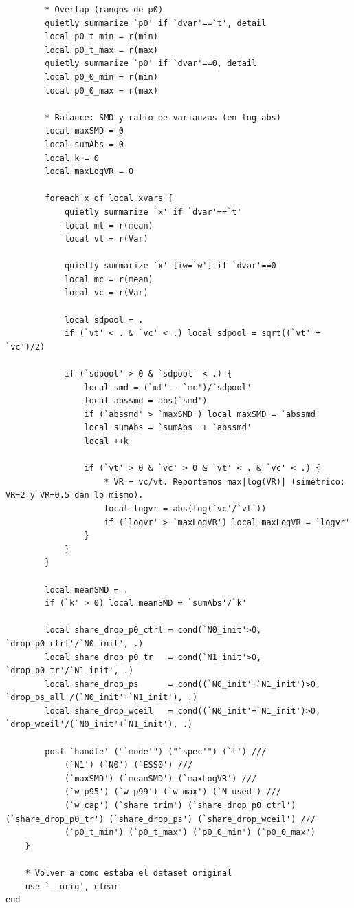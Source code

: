 \documentclass[12pt]{article}
\begin{document}
\begin{lstlisting}
        * Overlap (rangos de p0)
        quietly summarize `p0' if `dvar'==`t', detail
        local p0_t_min = r(min)
        local p0_t_max = r(max)
        quietly summarize `p0' if `dvar'==0, detail
        local p0_0_min = r(min)
        local p0_0_max = r(max)

        * Balance: SMD y ratio de varianzas (en log abs)
        local maxSMD = 0
        local sumAbs = 0
        local k = 0
        local maxLogVR = 0

        foreach x of local xvars {
            quietly summarize `x' if `dvar'==`t'
            local mt = r(mean)
            local vt = r(Var)

            quietly summarize `x' [iw=`w'] if `dvar'==0
            local mc = r(mean)
            local vc = r(Var)

            local sdpool = .
            if (`vt' < . & `vc' < .) local sdpool = sqrt((`vt' + `vc')/2)

            if (`sdpool' > 0 & `sdpool' < .) {
                local smd = (`mt' - `mc')/`sdpool'
                local abssmd = abs(`smd')
                if (`abssmd' > `maxSMD') local maxSMD = `abssmd'
                local sumAbs = `sumAbs' + `abssmd'
                local ++k

                if (`vt' > 0 & `vc' > 0 & `vt' < . & `vc' < .) {
                    * VR = vc/vt. Reportamos max|log(VR)| (simétrico: VR=2 y VR=0.5 dan lo mismo).
                    local logvr = abs(log(`vc'/`vt'))
                    if (`logvr' > `maxLogVR') local maxLogVR = `logvr'
                }
            }
        }

        local meanSMD = .
        if (`k' > 0) local meanSMD = `sumAbs'/`k'

        local share_drop_p0_ctrl = cond(`N0_init'>0, `drop_p0_ctrl'/`N0_init', .)
        local share_drop_p0_tr   = cond(`N1_init'>0, `drop_p0_tr'/`N1_init', .)
        local share_drop_ps      = cond((`N0_init'+`N1_init')>0, `drop_ps_all'/(`N0_init'+`N1_init'), .)
        local share_drop_wceil   = cond((`N0_init'+`N1_init')>0, `drop_wceil'/(`N0_init'+`N1_init'), .)

        post `handle' ("`mode'") ("`spec'") (`t') ///
            (`N1') (`N0') (`ESS0') ///
            (`maxSMD') (`meanSMD') (`maxLogVR') ///
            (`w_p95') (`w_p99') (`w_max') (`N_used') ///
            (`w_cap') (`share_trim') (`share_drop_p0_ctrl') (`share_drop_p0_tr') (`share_drop_ps') (`share_drop_wceil') ///
            (`p0_t_min') (`p0_t_max') (`p0_0_min') (`p0_0_max')
    }

    * Volver a como estaba el dataset original
    use `__orig', clear
end
\end{lstlisting}
\end{document}
